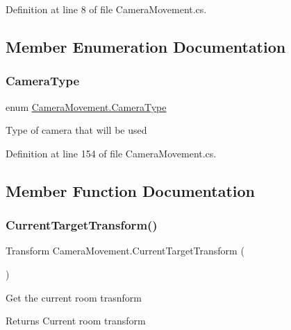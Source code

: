 Definition at line 8 of file Camera\+Movement.\+cs.



\subsection{Member Enumeration Documentation}
\mbox{\label{class_camera_movement_a297cb93f5fc197103c3447dac2340a83}} 
\subsubsection{\texorpdfstring{Camera\+Type}{CameraType}}
{\footnotesize\ttfamily enum \mbox{\hyperlink{class_camera_movement_a297cb93f5fc197103c3447dac2340a83}{Camera\+Movement.\+Camera\+Type}}\hspace{0.3cm}{\ttfamily [strong]}}



Type of camera that will be used 



Definition at line 154 of file Camera\+Movement.\+cs.



\subsection{Member Function Documentation}
\mbox{\label{class_camera_movement_ad707fba6a3e906310efa90dd4285a407}} 
\subsubsection{\texorpdfstring{Current\+Target\+Transform()}{CurrentTargetTransform()}}
{\footnotesize\ttfamily Transform Camera\+Movement.\+Current\+Target\+Transform (\begin{DoxyParamCaption}{ }\end{DoxyParamCaption})}



Get the current room trasnform 

\begin{DoxyReturn}{Returns}
Current room transform
\end{DoxyReturn}


